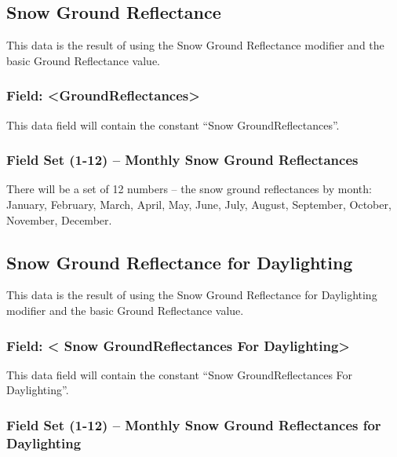 \subsection{Snow Ground Reflectance}\label{snow-ground-reflectance}

This data is the result of using the Snow Ground Reflectance modifier and the basic Ground Reflectance value.

\subsubsection{Field: \textless{}GroundReflectances\textgreater{}}\label{field-groundreflectances-1}

This data field will contain the constant ``Snow GroundReflectances''.

\subsubsection{Field Set (1-12) -- Monthly Snow Ground Reflectances}\label{field-set-1-12-monthly-snow-ground-reflectances}

There will be a set of 12 numbers -- the snow ground reflectances by month: January, February, March, April, May, June, July, August, September, October, November, December.

\subsection{Snow Ground Reflectance for Daylighting}\label{snow-ground-reflectance-for-daylighting}

This data is the result of using the Snow Ground Reflectance for Daylighting modifier and the basic Ground Reflectance value.

\subsubsection{Field: \textless{} Snow GroundReflectances For Daylighting\textgreater{}}\label{field-snow-groundreflectances-for-daylighting}

This data field will contain the constant ``Snow GroundReflectances For Daylighting''.

\subsubsection{Field Set (1-12) -- Monthly Snow Ground Reflectances for Daylighting}\label{field-set-1-12-monthly-snow-ground-reflectances-for-daylighting}

